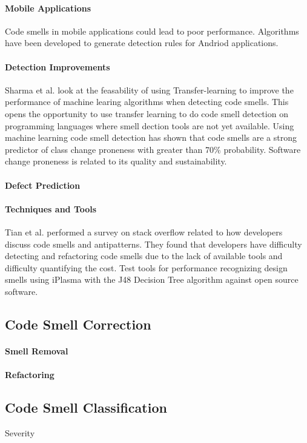 \documentclass[conference]{IEEEtran}
\begin{document}
\paragraph{Mobile Applications}
Code smells in mobile applications could lead to poor performance. Algorithms have been developed\cite{rubin_sniffing_2019} to generate detection rules for Andriod applications.
\paragraph{Detection Improvements}
Sharma et al.\cite{sharma_feasibility_2019} look at the feasability of using Transfer-learning to improve the performance of machine learing algorithms when detecting code smells. This opens the opportunity to use transfer learning to do code smell detection on programming languages where smell dection tools are not yet available.
Using machine learning code smell detection has shown that code smells are a strong predictor of class change proneness\cite{pritam_assessment_2019} with greater than 70\% probability. Software change proneness is related to its quality and sustainability.
\paragraph{Defect Prediction}
\paragraph{Techniques and Tools}
Tian et al.\cite{tian_how_2019} performed a survey on stack overflow related to how developers discuss code smells and antipatterns. 
They found that developers have difficulty detecting and refactoring code smells due to the lack of available tools and difficulty quantifying the cost.
Test tools for performance recognizing design smells using iPlasma with the J48 Decision Tree algorithm\cite{singh_systematic_2018} against open source software.
\subsection{Code Smell Correction}
\paragraph{Smell Removal}
\paragraph{Refactoring}
\subsection{Code Smell Classification}
Severity
\end{document}
